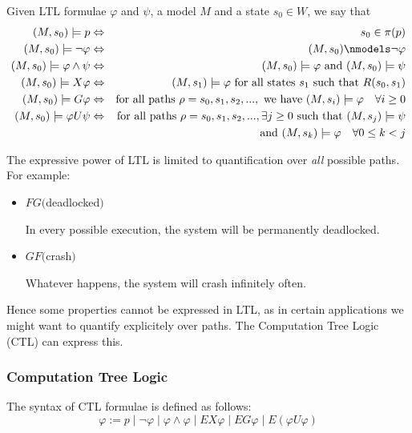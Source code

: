 \documentclass[11pt]{article}
\newenvironment{definition}[1][Definition]{\begin{trivlist}
\item[\hskip \labelsep {\bfseries #1}]}{\end{trivlist}}
\begin{document}
\begin{definition}
Given LTL formulae $\varphi$ and $\psi$, a model $M$ and a state $s_0 \in W$, we say that
\begin{eqnarray*}
(M, s_0) \models p &\Leftrightarrow& s_0 \in \pi(p) \\  
(M, s_0) \models \lnot \varphi &\Leftrightarrow& (M, s_0) \nmodels \lnot \varphi\\
(M, s_0) \models \varphi \land \psi &\Leftrightarrow& (M, s_0) \models \varphi \mbox{ and  } (M, s_0) \models \psi \\
(M, s_0) \models X\varphi &\Leftrightarrow& (M, s_1) \models \varphi \mbox{  for all states } s_1 \mbox{ such that } R(s_0, s_1)\\
(M, s_0) \models G\varphi &\Leftrightarrow& \mbox{for all paths } \rho = s_0, s_1, s_2, ... , \mbox{ we have } (M, s_i) \models \varphi \quad \forall i \geq 0 \\
(M, s_0) \models \varphi U\psi &\Leftrightarrow& \mbox{for all paths } \rho = s_0, s_1, s_2, ..., \exists j \geq 0 \mbox{ such that }  (M, s_j) \models \psi \\ && \mbox{ and }  (M, s_k) \models \varphi \quad \forall 0 \leq k < j
\end{eqnarray*}

\end{definition}
The expressive power of LTL is limited to quantification over \textit{all} possible paths. For example: 

\begin{itemize}
\item $FG($deadlocked$)$ 

In every possible execution, the system will be permanently deadlocked.


\item $GF($crash$)$

Whatever happens, the system will crash infinitely often.
\end{itemize}
Hence some properties cannot be expressed in LTL, as in certain applications we might want to quantify explicitely over paths. The Computation Tree Logic (CTL) can express this. 

\subsubsection{Computation Tree Logic} 

\begin{definition} 
The syntax of CTL formulae is defined as follows: 
$$ \varphi := p \mid \lnot \varphi \mid \varphi \land \varphi \mid EX\varphi \mid EG\varphi \mid E(\varphi U \varphi)$$
\end{definition}
\end{document}
